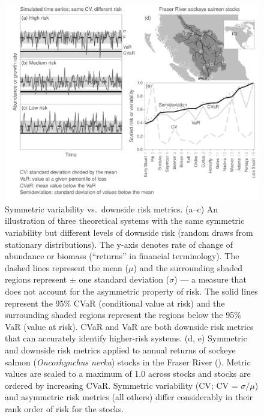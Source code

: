 \begin{figure}[htbp]
\centering
\includegraphics[width=5.5in]{risk-fig/risk-fig-bw.pdf}
\caption{
Symmetric variability vs.~downside risk metrics. (a--c) An illustration of
three theoretical systems with the same symmetric variability but different
levels of downside risk (random draws from stationary distributions). The
y-axis denotes rate of change of abundance or biomass (``returns'' in
financial terminology). The dashed lines represent the mean ($\mu$) and the
surrounding shaded regions represent $\pm$ one standard deviation
($\sigma$) --- a measure that does not account for the asymmetric property of
risk. The solid lines represent the 95\% CVaR (conditional value at risk) and
the surrounding shaded regions represent the regions below the 95\% VaR (value
at risk). CVaR and VaR are both downside risk metrics that can accurately
identify higher-risk systems. (d, e) Symmetric and downside risk metrics
applied to annual returns of sockeye salmon (\emph{Oncorhynchus nerka}) stocks
in the Fraser River (\citep[data from][]{dorner2008}). Metric values are
scaled to a maximum of 1.0 across stocks and stocks are ordered by increasing
CVaR. Symmetric variability (CV; CV = $\sigma / \mu$) and asymmetric risk
metrics (all others) differ considerably in their rank order of risk for the
stocks.
}
\label{fig:risk}
\end{figure}
